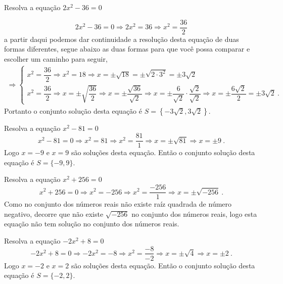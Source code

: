  \begin{exem}
 Resolva a equação $2x^2 - 36=0$

\begin{equation}
2x^2 - 36=0 \Rightarrow 2x^2= 36 \Rightarrow x^2= \frac{36}{2} 
\end{equation}
 a partir daqui podemos dar continuidade a resolução desta equação de duas formas diferentes, segue abaixo as duas formas para que você possa comparar e escolher um caminho para seguir,
 \begin{eqnarray*}
 \Rightarrow
 \begin{cases}
 x^2= \dfrac{36}{2} \Rightarrow x^2= 18 \Rightarrow x= \pm \sqrt{18}= \pm \sqrt{2 \cdot 3^2}= \pm 3\sqrt{2} \\
 x^2= \dfrac{36}{2} \Rightarrow x= \pm \sqrt{\dfrac{36}{2}} \Rightarrow x= \pm \dfrac{\sqrt{36}}{\sqrt{2}} \Rightarrow x= \pm \dfrac{6}{\sqrt{2}} \cdot \dfrac{\sqrt{2}}{\sqrt{2}} \Rightarrow x= \pm  \dfrac{6\sqrt{2}}{2}= \pm 3\sqrt{2} \ .
 \end{cases}
 \end{eqnarray*}
 Portanto o conjunto solução desta equação é $S= \left\{-3\sqrt{2}, 3\sqrt{2}\right\}$.
 \end{exem}

 \begin{exem}
  Resolva a equação $x^2 - 81=0$
\begin{equation}
x^2 - 81=0 \Rightarrow x^2= 81 \Rightarrow x^2= \frac{81}{1} \Rightarrow x= \pm \sqrt{81} \Rightarrow x= \pm 9 \ .
\end{equation}
 Logo $x= -9$ e $x= 9$ são soluções desta equação. Então o conjunto solução desta equação é $S= \{-9, 9\}$.
\end{exem}

 \begin{exem}
  Resolva a equação $x^2 + 256=0$
\begin{equation}
x^2 +256=0 \Rightarrow x^2= -256 \Rightarrow x^2= \frac{-256}{1} \Rightarrow x= \pm \sqrt{-256} \ .
\end{equation}
 Como no conjunto dos números reais não existe raíz quadrada de número negativo, decorre que não existe $\sqrt{-256}$ no conjunto dos números reais, logo esta equação não tem solução no conjunto dos números reais.
 \end{exem}

 \begin{exem}
  Resolva a equação $-2x^2 + 8=0$
\begin{equation}
-2x^2 + 8=0 \Rightarrow -2x^2= -8 \Rightarrow x^2= \frac{-8}{-2} \Rightarrow x= \pm \sqrt{4} \Rightarrow x= \pm 2 \ .
\end{equation}
 Logo $x= -2$ e $x= 2$ são soluções desta equação. Então o conjunto solução desta equação é $S= \{-2, 2\}$.
\end{exem}

